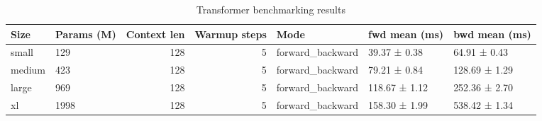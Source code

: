 \begin{table}
\caption{Transformer benchmarking results}
\label{tab:benchmarks}
\begin{tabular}{llrrlll}
\toprule
Size & Params (M) & Context len & Warmup steps & Mode & fwd mean (ms) & bwd mean (ms) \\
\midrule
small & 129 & 128 & 5 & forward_backward & 39.37 ± 0.38 & 64.91 ± 0.43 \\
medium & 423 & 128 & 5 & forward_backward & 79.21 ± 0.84 & 128.69 ± 1.29 \\
large & 969 & 128 & 5 & forward_backward & 118.67 ± 1.12 & 252.36 ± 2.70 \\
xl & 1998 & 128 & 5 & forward_backward & 158.30 ± 1.99 & 538.42 ± 1.34 \\
\bottomrule
\end{tabular}
\end{table}
